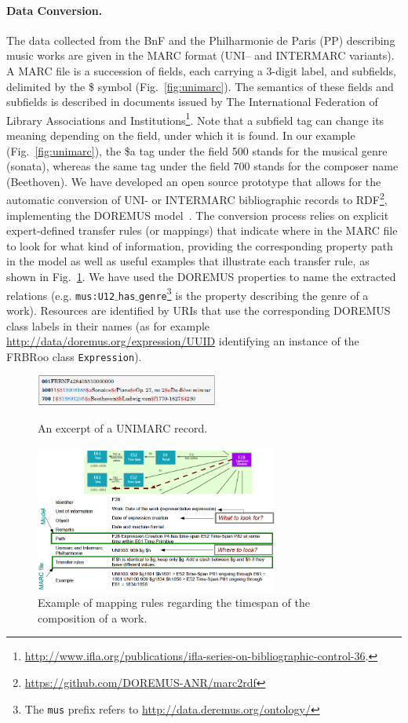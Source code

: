 \documentclass[runningheads,a4paper]{llncs}
\begin{document}
\paragraph{{\bf Data Conversion.}} The data collected from the BnF and the Philharmonie de Paris (PP) describing music works are given in the MARC format (UNI-- and INTERMARC variants). A MARC file is a succession of fields, each carrying a 3-digit label, and subfields, delimited by the \$ symbol (Fig.~\ref{fig:unimarc}). The semantics of these fields and subfields is described in documents issued by The International Federation of Library Associations and Institutions\footnote{\url{http://www.ifla.org/publications/ifla-series-on-bibliographic-control-36}.}. Note that a subfield tag can change its meaning depending on the field, under which it is found. In our example (Fig.~\ref{fig:unimarc}), the \$a tag under the field 500 stands for the musical genre (sonata), whereas the same tag under the field 700 stands for the composer name (Beethoven). We have developed an open source prototype that allows for the automatic conversion of UNI- or INTERMARC bibliographic records to RDF\footnote{\url{https://github.com/DOREMUS-ANR/marc2rdf}}, implementing the DOREMUS model~\cite{choffe2016doremus}. The conversion process relies on explicit expert-defined transfer rules (or mappings) that indicate where in the MARC file to look for what kind of information, providing the corresponding property path in the model as well as useful examples that illustrate each transfer rule, as shown in Fig.~\ref{fig:mappings}. We have used the DOREMUS properties to name the extracted relations (e.g. \texttt{mus:U12$\_$has$\_$genre}\footnote{The \texttt{mus} prefix refers to \url{http://data.deremus.org/ontology/}} is the property describing the genre of a work). Resources are identified by URIs that use the corresponding DOREMUS class labels in their names (as for example \url{http://data/doremus.org/expression/UUID} identifying an instance of the FRBRoo class \texttt{Expression}).
\begin{figure}
  \centering
  \includegraphics[width=6cm]{img/marc-exmpl-simple.png}
  \caption{An excerpt of a UNIMARC record.}
  \label{fig:unimarc}
\smallskip
  \centering
  \includegraphics[width=8cm]{img/mapping-rules.png}
  \caption{Example of mapping rules regarding the timespan of the composition of a work.}
  \label{fig:mappings}
\end{figure}
\end{document}

